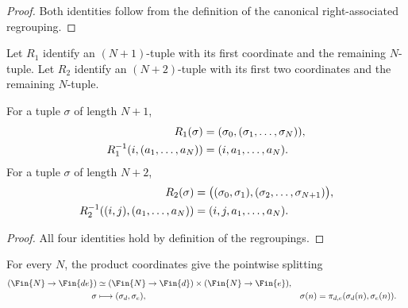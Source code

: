 \begin{proof}
    \leanok
    Both identities follow from the definition of the canonical
    right-associated regrouping.
\end{proof}

\begin{definition}
    \label{def:finite_tuple_regroupings}
    \leanok
    Let $R_1$ identify an $(N+1)$-tuple with its first coordinate and the
    remaining $N$-tuple. Let $R_2$ identify an $(N+2)$-tuple with its first
    two coordinates and the remaining $N$-tuple.
\end{definition}

\begin{lemma}
    \label{lem:mpdo_global_renormalization_regrouping}
    \leanok
    For a tuple $\sigma$ of length $N+1$,
    \begin{align}
        R_1(\sigma)
         & =(\sigma_0,(\sigma_1,\ldots,\sigma_N)),
        \notag                                     \\
        R_1^{-1}(i,(a_1,\ldots,a_N))
         & =(i,a_1,\ldots,a_N).
        \notag
    \end{align}
    For a tuple $\sigma$ of length $N+2$,
    \begin{align}
        R_2(\sigma)
         & =\bigl((\sigma_0,\sigma_1),
        (\sigma_2,\ldots,\sigma_{N+1})\bigr),
        \notag                         \\
        R_2^{-1}((i,j),(a_1,\ldots,a_N))
         & =(i,j,a_1,\ldots,a_N).
        \notag
    \end{align}
\end{lemma}

\begin{proof}
    \leanok
    All four identities hold by definition of the regroupings.
\end{proof}

\begin{definition}
    \label{def:elementary_tuple_product_split}
    \leanok
    For every $N$, the product coordinates give the pointwise splitting
    \begin{align}
        (\Fin{N}\to\Fin{de})
                  & \simeq(\Fin{N}\to\Fin{d})\times(\Fin{N}\to\Fin{e}), \notag \\
        \sigma    & \longmapsto(\sigma_d,\sigma_e),
                  &
        \sigma(n) & =\pi_{d,e}(\sigma_d(n),\sigma_e(n)).
        \label{eq:elementary_tuple_product_split}
    \end{align}
\end{definition}

